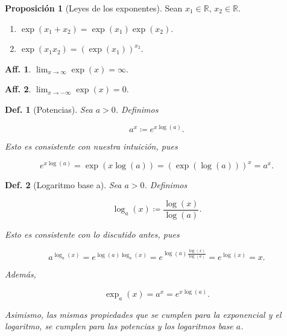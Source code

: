 \documentclass{article}
\theoremstyle{definicion}
\newtheorem{definicion}{Def.}
\theoremstyle{definition}             %
\theoremstyle{definition}             %
\theoremstyle{definition}
\theoremstyle{definition}
\theoremstyle{observacion}
\theoremstyle{definition}
\newtheorem{prop}{Proposición}
\theoremstyle{plain}
\theoremstyle{definition}
\theoremstyle{afirmacion}
\newtheorem{aff}{Aff.}
\theoremstyle{definition}
\begin{document}
    \begin{prop}[Leyes de los exponentes]
        Sean \(x_{1}\in\mathbb{R},\, x_{2}\in\mathbb{R}\).
        
        \begin{enumerate}[label = \roman*)]
            \item \(\exp(x_{1} + x_{2}) = \exp(x_{1})\exp(x_{2})\).
            \item \(\exp(x_{1}x_{2}) = (\exp(x_{1}))^{x_{2}}\).
        \end{enumerate}
    \end{prop}

    \begin{aff}
        \(\lim_{x\to\infty} \exp(x) = \infty\).
    \end{aff}

    \begin{aff}
        \(\lim_{x\to -\infty} \exp(x) = 0\).
    \end{aff}

    \begin{definicion}[Potencias]
        Sea \(a > 0\). Definimos

        \begin{equation*}
            a^{x} \coloneq e^{x\log(a)}.
        \end{equation*}

        Esto es consistente con nuestra intuición, pues 

        \begin{equation*}
            e^{x\log(a)} = \exp(x\log(a)) = (\exp(\log(a)))^{x} = a^{x}.
        \end{equation*}
    \end{definicion}

    \begin{definicion}[Logaritmo base a]
        Sea \(a > 0\). Definimos 
        
        \begin{equation*}
            \log_{a}(x) \coloneq \dfrac{\log(x)}{\log(a)}.
        \end{equation*}

        Esto es consistente con lo discutido antes, pues

        \begin{equation*}
            a^{\log_{a}(x)} = e^{\log(a)\log_{a}(x)} = e^{\log(a)\frac{\log(x)}{\log(a)}} = e^{\log(x)} = x.
        \end{equation*}

        Además,

        \begin{equation*}
            \exp_{a}(x) = a^{x} = e^{x\log(a)}.
        \end{equation*}

        Asimismo, las mismas propiedades que se cumplen para la exponencial y el logaritmo, se cumplen para las potencias y los logaritmos base \(a\).
    \end{definicion}
\end{document}
